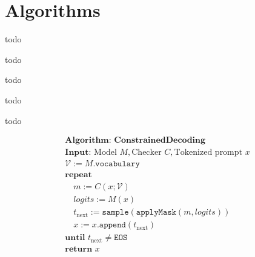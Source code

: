 

\section{Algorithms}

\begin{definition}
	\label{def:Finite-State Automata}
	todo
\end{definition}

\begin{definition}
	\label{def:Context-Free Grammar}
	todo
\end{definition}

\begin{definition}
	\label{def:Finite-State Transducer}
	todo
\end{definition}

\begin{definition}
	\label{def:Pushdown Automata}
	todo
\end{definition}

\begin{definition}[Checker]
    \label{def:Checker}
    todo
\end{definition}

\begin{definition}[ConstrainedDecoding]
    \label{def:ConstrainedDecoding}
    \[
    \begin{array}{l}
    \textbf{Algorithm: ConstrainedDecoding} \\
    \textbf{Input: } \text{Model } M, \text{Checker } C, \text{Tokenized prompt } x \\
    \mathcal{V} := M.\texttt{vocabulary} \\
    \textbf{repeat} \\
    \quad m := C(x; \mathcal{V}) \\
    \quad \textit{logits} := M(x) \\
    \quad t_{\text{next}} := \texttt{sample}(\texttt{applyMask}(m, \textit{logits})) \\
    \quad x := x.\texttt{append}(t_{\text{next}}) \\
    \textbf{until } t_{\text{next}} \ne \texttt{EOS} \\
    \textbf{return } x \\
    \end{array}
    \]
\end{definition}


